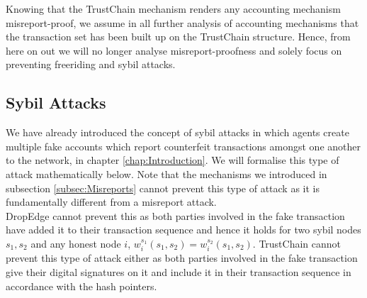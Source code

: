 \noindent{}Knowing that the TrustChain mechanism renders any accounting mechanism misreport-proof, we assume in all further analysis of accounting mechanisms that the transaction set has been built up on the TrustChain structure. Hence, from here on out we will no longer analyse misreport-proofness and solely focus on preventing freeriding and sybil attacks. \vspace{1em}\\


\subsection{Sybil Attacks}
\label{subsec:Sybil Attacks}
\noindent{}We have already introduced the concept of sybil attacks in which agents create multiple fake accounts which report counterfeit transactions amongst one another to the network, in chapter \ref{chap:Introduction}. We will formalise this type of attack mathematically below. Note that the mechanisms we introduced in subsection \ref{subsec:Misreports} cannot prevent this type of attack as it is fundamentally different from a misreport attack.\vspace{1em}\\

\noindent{}DropEdge cannot prevent this as both parties involved in the fake transaction have added it to their transaction sequence and hence it holds for two sybil nodes $s_1,s_2$ and any honest node $i$, $w_i^{s_1}(s_1,s_2)=w_i^{s_2}(s_1,s_2)$. TrustChain cannot prevent this type of attack either as both parties involved in the fake transaction give their digital signatures on it and include it in their transaction sequence in accordance with the hash pointers.\vspace{1em}\\

